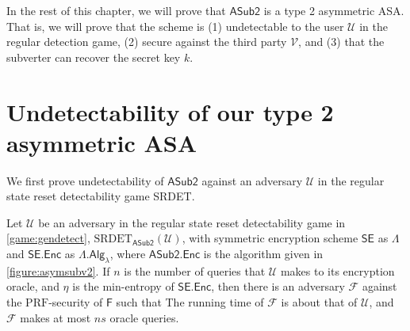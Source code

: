In the rest of this chapter, we will prove that $\mathsf{ASub2}$ is a type 2 asymmetric ASA. That is, we will prove that the scheme is (1) undetectable to the user $\mathcal{U}$ in the regular detection game, (2) secure against the third party $\mathcal{V}$, and (3) that the subverter can recover the secret key $k$.

\section{Undetectability of our type 2 asymmetric ASA}
We first prove undetectability of $\mathsf{ASub2}$ against an adversary $\mathcal{U}$ in the regular state reset detectability game SRDET.

\begin{theorem} \label{theorem:detect2}
Let $\mathcal{U}$ be an adversary in the regular state reset detectability game in \autoref{game:gendetect}, $\mathrm{SRDET}_\mathsf{ASub2}(\mathcal{U})$, with symmetric encryption scheme $\mathsf{SE}$ as $\mathsf{\Lambda}$ and $\mathsf{SE.Enc}$ as $\mathsf{\Lambda.Alg}_\lambda$, where $\mathsf{ASub2.Enc}$ is the algorithm given in \autoref{figure:asymsubv2}. If $n$ is the number of queries that $\mathcal{U}$ makes to its encryption oracle, and $\eta$ is the min-entropy of $\mathsf{SE.Enc}$, then there is an adversary $\mathcal{F}$ against the $\mathrm{PRF}$-security of $\mathsf{F}$ such that
The running time of $\mathcal{F}$ is about that of $\mathcal{U}$, and $\mathcal{F}$ makes at most $ns$ oracle queries.
\end{theorem}
